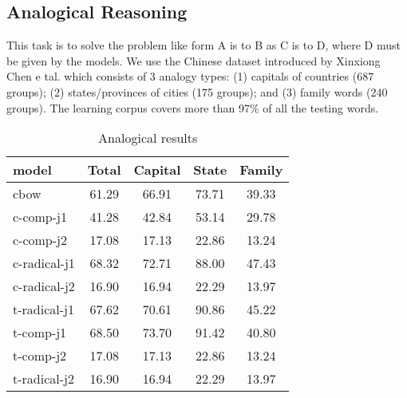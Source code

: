 \subsection{Analogical Reasoning}
This task is to solve the problem like form A is to B as C is to D, where D must be given by the models. We use the Chinese dataset introduced by Xinxiong Chen e tal. which consists of 3 analogy types: (1) capitals of countries (687 groups); (2) states/provinces of cities (175 groups); and (3) family words (240 groups). The learning corpus covers more than 97\% of all the testing words. 
\begin{table}[h]
\begin{center}
\begin{tabular}{lcccc}
\hline \bf model & \bf Total & \bf Capital & \bf State & \bf Family\\ \hline
cbow & 61.29 & 66.91 & 73.71 & 39.33 \\
c-comp-j1 & 41.28 & 42.84 & 53.14 & 29.78 \\   
c-comp-j2 & 17.08 & 17.13 & 22.86 & 13.24 \\
c-radical-j1 & 68.32 & 72.71 & 88.00 & 47.43 \\
c-radical-j2 & 16.90 & 16.94 & 22.29 & 13.97 \\
t-radical-j1  & 67.62 & 70.61 & 90.86 & 45.22 \\
t-comp-j1  & 68.50 & 73.70 & 91.42 & 40.80 \\
t-comp-j2 & 17.08 & 17.13 & 22.86 & 13.24 \\
t-radical-j2 & 16.90 & 16.94 & 22.29 & 13.97 \\
\hline
\end{tabular}
\end{center}
\caption{\label{font-table} Analogical results }
\end{table}
